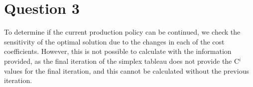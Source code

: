 \section*{Question 3}
To determine if the current production policy can be continued, we check the sensitivity of the optimal solution due to the changes in each of the cost coefficients. However, this is not possible to calculate with the information provided, as the final iteration of the simplex tableau does not provide the C$^i$ values for the final iteration, and this cannot be calculated without the previous iteration.